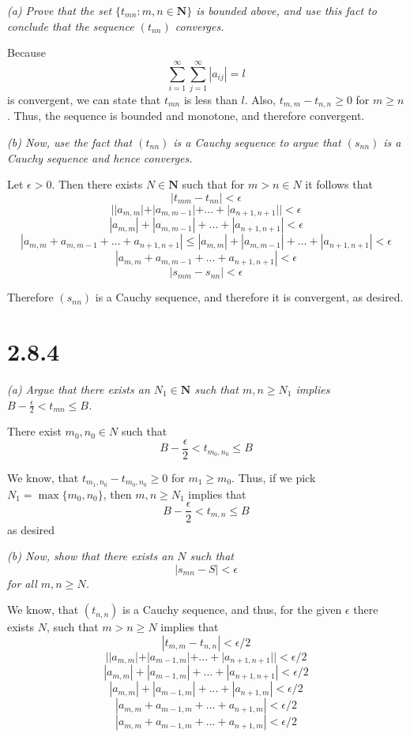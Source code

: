 \documentclass[11pt,oneside,titlepage]{article}
\begin{document}
\textit{(a) Prove that the set $\{t_{mn}: m, n \in \textbf{N}\}$ is bounded
  above, and use this fact to conclude that the sequence $(t_{nn})$ converges.}

Because
$$\sum_{i = 1}^{\infty}\sum_{j = 1}^{\infty}|a_{ij}| = l$$
is convergent, we can state that $t_{mn}$ is less than $l$. Also,
$t_{m, m} - t_{n,n} \geq 0$ for $m \geq n$. Thus, the sequence is bounded
and monotone, and therefore convergent.

\textit{(b) Now, use the fact that $(t_{nn})$ is a Cauchy sequence to argue
  that $(s_{nn})$ is a Cauchy sequence and hence converges.}

Let $\epsilon > 0$. Then there exists $N \in \textbf{N}$ such  that for
$m > n \in N$ it follows that
$$|t_{mm} - t_{nn}| < \epsilon$$
$$||a_{m,m}| + |a_{m, m - 1}| + ... + |a_{n + 1, n + 1}|| < \epsilon$$
$$|a_{m,m}| + |a_{m, m - 1}| + ... + |a_{n + 1, n + 1}| < \epsilon$$
$$|a_{m,m} + a_{m, m - 1} + ... + a_{n + 1, n + 1}| \leq |a_{m,m}| + |a_{m, m - 1}| + ... + |a_{n + 1, n + 1}| < \epsilon$$
$$|a_{m,m} + a_{m, m - 1} + ... + a_{n + 1, n + 1}|  < \epsilon$$
$$|s_{mm} - s_{nn}|  < \epsilon$$

Therefore $(s_{nn})$ is a Cauchy sequence, and therefore it is convergent, as
desired.

\section*{2.8.4}
\textit{(a) Argue that there exists an $N_1 \in \textbf{N}$ such that
  $m, n \geq N_1$ implies $B - \frac{\epsilon}{2} < t_{mn} \leq B$.}

There exist $m_0, n_0 \in N$ such that
$$B - \frac{\epsilon}{2} < t_{m_0, n_0} \leq B$$

We know, that $t_{m_1, n_0} - t_{m_0, n_0} \geq 0$ for $m_1 \geq m_0$. Thus,
if we pick $N_1 = \max\{m_0, n_0\}$, then $m, n \geq N_1$ implies that 
$$B - \frac{\epsilon}{2} < t_{m, n} \leq B$$
as desired

\textit{(b) Now, show that there exists an $N$ such that }
$$|s_{mn} - S| < \epsilon$$
\textit{for all $m, n \geq N$.}

We know, that $(t_{n,n})$ is a Cauchy sequence, and thus, for the given
$\epsilon$ there exists $N$, such that $m > n \geq N$ implies that 
$$|t_{m,m} - t_{n,n}| < \epsilon/2$$
$$||a_{m,m}| + |a_{m - 1, m}| + ... + |a_{n + 1,n + 1}|| < \epsilon/2$$
$$|a_{m,m}| + |a_{m - 1, m}| + ... + |a_{n + 1,n + 1}| < \epsilon/2$$
$$|a_{m,m}| + |a_{m - 1, m}| + ... + |a_{n + 1,m}| < \epsilon/2$$
$$|a_{m,m} + a_{m - 1, m} + ... + a_{n + 1,m}| < \epsilon/2$$
$$|a_{m,m} + a_{m - 1, m} + ... + a_{n + 1,m}| < \epsilon/2$$
\end{document}
